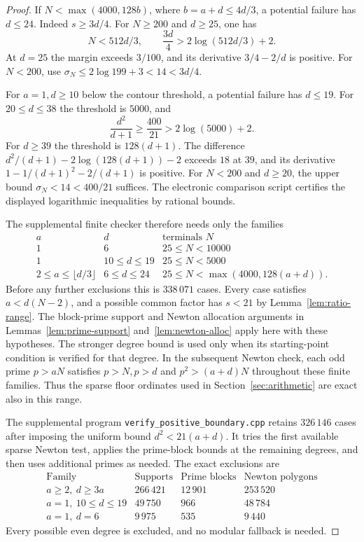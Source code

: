\begin{proof}
If \(N<\max(4000,128b)\), where \(b=a+d\le4d/3\), a
potential failure has \(d\le24\). Indeed \(s\ge3d/4\).
For \(N\ge200\) and \(d\ge25\), one has
\[
 N<512d/3,\qquad \frac{3d}{4}>2\log(512d/3)+2 .
\]
At \(d=25\) the margin exceeds \(3/100\), and its derivative
\(3/4-2/d\) is positive. For \(N<200\), use
\(\sigma_N\le 2\log 199+3<14<3d/4\).

For \(a=1,d\ge10\) below the contour threshold,
a potential failure has \(d\le19\).
For \(20\le d\le38\) the threshold is \(5000\), and
\[
 \frac{d^2}{d+1}\ge\frac{400}{21}>2\log(5000)+2 .
\]
For \(d\ge39\) the threshold is \(128(d+1)\). The difference
\(d^2/(d+1)-2\log(128(d+1))-2\) exceeds \(18\) at \(39\),
and its derivative \(1-1/(d+1)^2-2/(d+1)\) is positive.
For \(N<200\) and \(d\ge20\), the upper bound
\(\sigma_N<14<400/21\) suffices. The electronic comparison
script certifies the displayed logarithmic inequalities by
rational bounds.

The supplemental finite checker therefore needs only the families
\[
\begin{array}{c|c|c}
a&d&\text{terminals }N\\ \hline
1&6&25\le N<10000\\
1&10\le d\le19&25\le N<5000\\
2\le a\le\lfloor d/3\rfloor&6\le d\le24&
                25\le N<\max(4000,128(a+d)).
\end{array}
\]
Before any further exclusions this is \(338\,071\) cases.
Every case satisfies \(a<d(N-2)\), and a possible common factor
has \(s<21\) by Lemma~\ref{lem:ratio-range}. The block-prime
support and Newton allocation arguments in
Lemmas~\ref{lem:prime-support} and~\ref{lem:newton-alloc}
apply here with these hypotheses. The stronger degree bound
is used only when its starting-point condition is verified
for that degree. In the subsequent Newton check, each odd
prime \(p>aN\) satisfies \(p>N,p>d\) and \(p^2>(a+d)N\)
throughout these finite families. Thus the sparse floor
ordinates used in Section~\ref{sec:arithmetic} are exact
also in this range.

The supplemental program \texttt{verify\_positive\_boundary.cpp}
retains \(326\,146\) cases after imposing the uniform bound
\(d^2<21(a+d)\). It tries the
first available sparse Newton test, applies the prime-block
bounds at the remaining degrees, and then uses additional
primes as needed. The exact exclusions are
\[
\begin{array}{l|r|r|r}
\text{Family}&\text{Supports}&\text{Prime blocks}&\text{Newton polygons}\\ \hline
a\ge2,\ d\ge3a &266\,421&12\,901&253\,520\\
a=1,\ 10\le d\le19&49\,750&966&48\,784\\
a=1,\ d=6&9\,975&535&9\,440
\end{array}
\]
Every possible even degree is excluded, and no modular fallback
is needed.
\end{proof}

